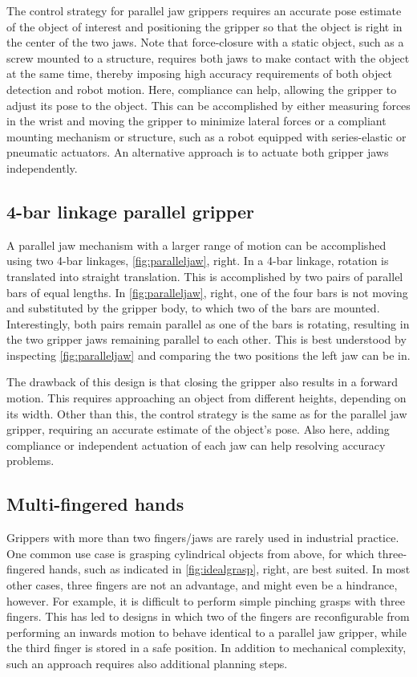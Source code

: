 The control strategy for parallel jaw grippers requires an accurate pose estimate of the object of interest and positioning the gripper so that the object is right in the center of the two jaws. Note that force-closure with a static object, such as a screw mounted to a structure, requires both jaws to make contact with the object at the same time, thereby imposing high accuracy requirements of both object detection and robot motion. Here, compliance can help, allowing the gripper to adjust its pose to the object. This can be accomplished by either measuring forces in the wrist and moving the gripper to minimize lateral forces or a compliant mounting mechanism or structure, such as a robot equipped with series-elastic or pneumatic actuators. An alternative approach is to actuate both gripper jaws independently.


\subsection{4-bar linkage parallel gripper}
A parallel jaw mechanism with a larger range of motion can be accomplished using two 4-bar linkages, \cref{fig:paralleljaw}, right. In a 4-bar linkage, rotation is translated into  straight translation. This is accomplished by two pairs of parallel bars of equal lengths. In \cref{fig:paralleljaw}, right, one of the four bars is not moving and substituted by the gripper body, to which two of the bars are mounted. Interestingly, both pairs remain parallel as one of the bars is rotating, resulting in the two gripper jaws remaining parallel to each other. This is best understood by inspecting \cref{fig:paralleljaw} and comparing the two positions the left jaw can be in.


The drawback of this design is that closing the gripper also results in a forward motion. This requires approaching an object from different heights, depending on its width. Other than this, the control strategy is the same as for the parallel jaw gripper, requiring an accurate estimate of the object's pose. Also here, adding compliance or independent actuation of each jaw can help resolving accuracy problems.

\subsection{Multi-fingered hands}
Grippers with more than two fingers/jaws are rarely used in industrial practice. One common use case is grasping cylindrical objects from above, for which three-fingered hands, such as indicated in \cref{fig:idealgrasp}, right, are best suited. In most other cases, three fingers are not an advantage, and might even be a hindrance, however. For example, it is difficult to perform simple pinching grasps with three fingers. This has led to designs in which two of the fingers are reconfigurable from performing an inwards motion to behave identical to a parallel jaw gripper, while the third finger is stored in a safe position. In addition to mechanical complexity, such an approach requires also additional planning steps.

